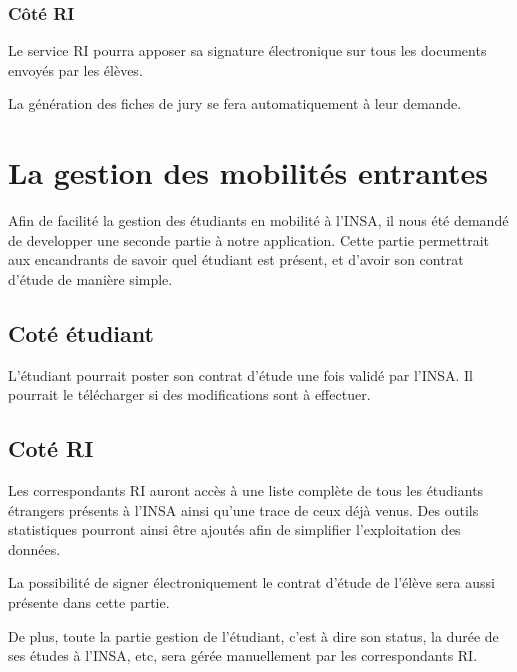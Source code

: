 		\subsubsection{Côté RI}
		
		Le service RI pourra apposer sa signature électronique sur tous les documents envoyés par les élèves.
		
		La génération des fiches de jury se fera automatiquement à leur demande.
		
		\section{La gestion des mobilités entrantes}
		
		Afin de facilité la gestion des étudiants en mobilité à l'INSA, il nous été demandé de developper une seconde partie à notre application. Cette partie permettrait aux encandrants de savoir quel étudiant est présent, et d'avoir son contrat d'étude de manière simple.
		
		\subsection{Coté étudiant}
		L'étudiant pourrait poster son contrat d'étude une fois validé par l'INSA. Il pourrait le télécharger si des modifications sont à effectuer.
		
		\subsection{Coté RI}
		Les correspondants RI auront accès à une liste complète de tous les étudiants étrangers présents à l'INSA ainsi qu'une trace de ceux déjà venus. Des outils statistiques pourront ainsi être ajoutés afin de simplifier l'exploitation des données. 
		
		La possibilité de signer électroniquement le contrat d'étude de l'élève sera aussi présente dans cette partie.
		
		De plus, toute la partie gestion de l'étudiant, c'est à dire son status, la durée de ses études à l'INSA, etc, sera gérée manuellement par les correspondants RI.